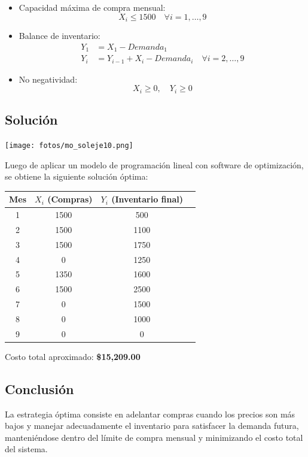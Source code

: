\documentclass[12pt, a4paper, oneside]{book}
\theoremstyle{definition}
\begin{document}
    \begin{itemize}
    \item Capacidad máxima de compra mensual:
        \[
        X_i \leq 1500 \quad \forall i = 1,\ldots,9
        \]

    \item Balance de inventario:
    \begin{align*}
        Y_1 &= X_1 - Demanda_1 \\
        Y_i &= Y_{i-1} + X_i - Demanda_i \quad \forall i = 2,\ldots,9
    \end{align*}

    \item No negatividad:
    \[
    X_i \geq 0, \quad Y_i \geq 0
    \]
    \end{itemize}

    \subsection{Solución}
    \begin{center}
    \texttt{[image: fotos/mo\_soleje10.png]}
    \end{center}

    Luego de aplicar un modelo de programación lineal con software de optimización, se obtiene la siguiente solución óptima:

    \begin{center}
    \begin{tabular}{cccc}
    \toprule
    Mes & \(X_i\) (Compras) & \(Y_i\) (Inventario final)\\
    \midrule
    1 & 1500 & 500 \\
    2 & 1500 & 1100 \\
    3 & 1500  & 1750 \\
    4 & 0 & 1250 \\
    5 & 1350  & 1600  \\
    6 & 1500 & 2500 \\
    7 & 0 & 1500 \\
    8 & 0  & 1000 \\
    9 & 0 & 0 \\
    \bottomrule
    \end{tabular}
    \end{center}

    Costo total aproximado: \textbf{\$15,209.00}

    \subsection{Conclusión}
    La estrategia óptima consiste en adelantar compras cuando los precios son más bajos y manejar adecuadamente el inventario para satisfacer la demanda futura, manteniéndose dentro del límite de compra mensual y minimizando el costo total del sistema.
\end{document}
